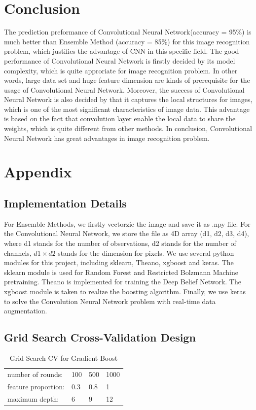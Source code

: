 \documentclass[11pt,oneside,a4paper]{article}
\numberwithin{equation}{section}
\begin{document}
\section{Conclusion}
The prediction preformance of Convolutional Neural Network(accuracy = 95\%) is much better than Ensemble Method (accuracy = 85\%) for this image recognition problem, which justifies the advantage of CNN in this specific field. The good performance of Convolutional Neural Network is firstly decided by its model complexity, which is quite approriate for image recognition problem. In other words, large data set and huge feature dimension are kinds of prerequisite for the usage of Convolutional Neural Network. Moreover, the success of Convolutional Neural Network is also decided by that it captures the local structures for images, which is one of the most significant characteristics of image data. This advantage is based on the fact that convolution layer enable the local data to share the weights, which is quite different from other methods. In conclusion, Convolutional Neural Network has great advantages in image recognition problem.

\printbibliography

\section*{Appendix}
\subsection*{Implementation Details}
For Ensemble Methods, we firstly vectorzie the image and save it as .npy file. For the Convolutional Neural Network, we store the file as 4D array (d1, d2, d3, d4), where d1 stands for the number of observations, d2 stands for the number of channels, $d1 \times d2$ stands for the dimension for pixels.
We use several python modules for this project, including sklearn, Theano, xgboost and keras. The sklearn module is used for Random Forest and Restricted Bolzmann Machine pretraining. Theano is implemented for training the Deep Belief Network. The xgboost module is taken to realize the boosting algorithm. Finally, we use keras to solve the Convolution Neural Network problem with real-time data augmentation.

\subsection*{Grid Search Cross-Validation Design}
\begin{table}[ht]
\centering
\small
\caption{Grid Search CV for Gradient Boost}
\label{cv:gb}
\begin{tabular}{llll}
\toprule
number of rounds: & 100 & 500 & 1000 \\
feature proportion:     & 0.3 & 0.8 & 1   \\
maximum depth:    & 6   & 9   & 12  \\
\bottomrule
\end{tabular}
\end{table}
\end{document}
